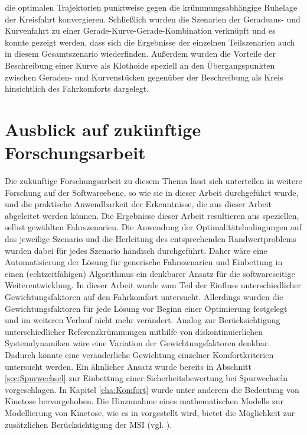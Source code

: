 die optimalen Trajektorien punktweise gegen die krümmungsabhängige Ruhelage der Kreisfahrt konvergieren. Schließlich wurden die Szenarien der Geradeaus- und Kurvenfahrt zu einer Gerade-Kurve-Gerade-Kombination verknüpft und es konnte gezeigt werden, dass sich die Ergebnisse der einzelnen Teilszenarien auch in diesem Gesamtszenario wiederfinden. Außerdem wurden die Vorteile der Beschreibung einer Kurve als Klothoide speziell an den Übergangspunkten zwischen Geraden- und Kurvenstücken gegenüber der Beschreibung als Kreis hinsichtlich des Fahrkomforts dargelegt.
\section{Ausblick auf zukünftige Forschungsarbeit}
Die zukünftige Forschungsarbeit zu diesem Thema lässt sich unterteilen in weitere Forschung auf der Softwareebene, so wie sie in dieser Arbeit durchgeführt wurde, und die praktische Anwendbarkeit der Erkenntnisse, die aus dieser Arbeit abgeleitet werden können. Die Ergebnisse dieser Arbeit resultieren aus speziellen, selbst gewählten Fahrszenarien. Die Anwendung der Optimalitätsbedingungen auf das jeweilige Szenario und die Herleitung des entsprechenden Randwertproblems wurden dabei für jedes Szenario händisch durchgeführt. Daher wäre eine Automatisierung der Lösung für generische Fahrszenarien und Einbettung in einen (echtzeitfähigen) Algorithmus ein denkbarer Ansatz für die softwareseitige Weiterentwicklung. In dieser Arbeit wurde zum Teil der Einfluss unterschiedlicher Gewichtungsfaktoren auf den Fahrkomfort untersucht. Allerdings wurden die Gewichtungsfaktoren für jede Lösung vor Beginn einer Optimierung festgelegt und im weiteren Verlauf nicht mehr verändert. Analog zur Berücksichtigung unterschiedlicher Referenzkrümmungen mithilfe von diskontinuierlichen Systemdynamiken wäre eine Variation der Gewichtungsfaktoren denkbar. Dadurch könnte eine veränderliche Gewichtung einzelner Komfortkriterien untersucht werden. Ein ähnlicher Ansatz wurde bereits in Abschnitt \ref{sec:Spurwechsel} zur Einbettung einer Sicherheitsbewertung bei Spurwechseln vorgeschlagen. In Kapitel \ref{cha:Komfort} wurde unter anderem die Bedeutung von Kinetose hervorgehoben. Die Hinzunahme eines mathematischen Modells zur Modellierung von Kinetose, wie es in \cite{Kamiji.17.09.200720.09.2007} vorgestellt wird, bietet die Möglichkeit zur zusätzlichen Berücksichtigung der \gls{MSI} (vgl. \cite{OHanlon.1974}).

